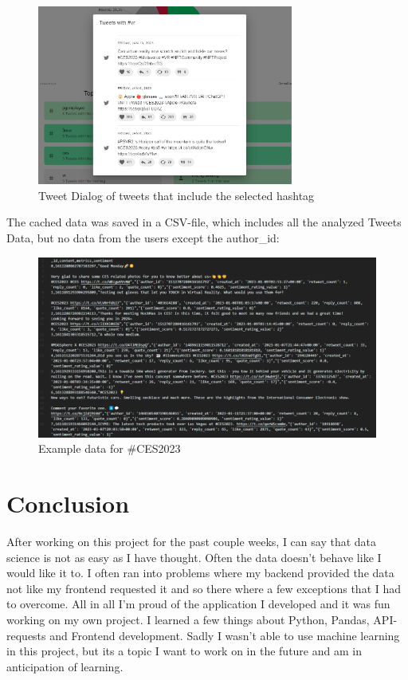 \documentclass[a4paper,oneside,11pt]{scrreprt}
\begin{document}
\begin{figure}[H]
    \centering
    \caption{Tweet Dialog of tweets that include the selected hashtag}
    \includegraphics[width=0.75\textwidth]{media/3_HashtagTweetsScreen.png}
\end{figure}

The cached data was saved in a CSV-file, which includes all the analyzed Tweets Data, but no data from the users except the author\_id:

\begin{figure}[H]
    \centering
    \caption{Example data for \#CES2023}
    \includegraphics[width=\textwidth]{media/3_CSV.png}
\end{figure}


\chapter{Conclusion}

After working on this project for the past couple weeks, I can say that data science is not as easy as I have thought. Often the data doesn't behave like I would like it to. I often ran into problems where my backend provided the data not like my frontend requested it and so there where a few exceptions that I had to overcome. All in all I'm proud of the application I developed and it was fun working on my own project. I learned a few things about Python, Pandas, API-requests and Frontend development. Sadly I wasn't able to use machine learning in this project, but its a topic I want to work on in the future and am in anticipation of learning.
\end{document}
